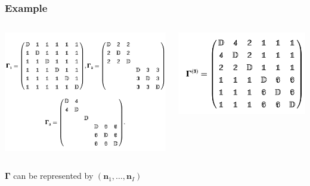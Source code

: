 \documentclass{beamer}
\begin{document}
  \begin{frame}
  \frametitle{Example }
  \begin{columns}[c] %
  \includegraphics[width = \textwidth]{blockmatrices.png}


  \includegraphics[width = \textwidth]{gamma3.png}
  \end{columns}

  $\boldsymbol\Gamma$ can be represented by $(\boldsymbol n_1, \ldots , \boldsymbol n_I)$
  \end{frame}
\end{document}

